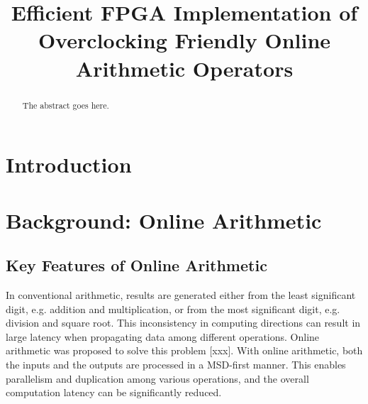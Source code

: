 \documentclass[conference]{IEEEtran}
\begin{document}
\title{Efficient FPGA Implementation of\\ Overclocking Friendly Online Arithmetic Operators}



\maketitle


\begin{abstract}
The abstract goes here.
\end{abstract}


%
\IEEEpeerreviewmaketitle



\section{Introduction}

\section{Background: Online Arithmetic}
\subsection{Key Features of Online Arithmetic}
In conventional arithmetic, results are generated either from the least significant digit, e.g. addition and multiplication, or from the most significant digit, e.g. division and square root. This inconsistency in computing directions can result in large latency when propagating data among different operations. Online arithmetic was proposed to solve this problem [xxx]. With online arithmetic, both the inputs and the outputs are processed in a MSD-first manner. This enables parallelism and duplication among various operations, and the overall computation latency can be significantly reduced.
\end{document}
